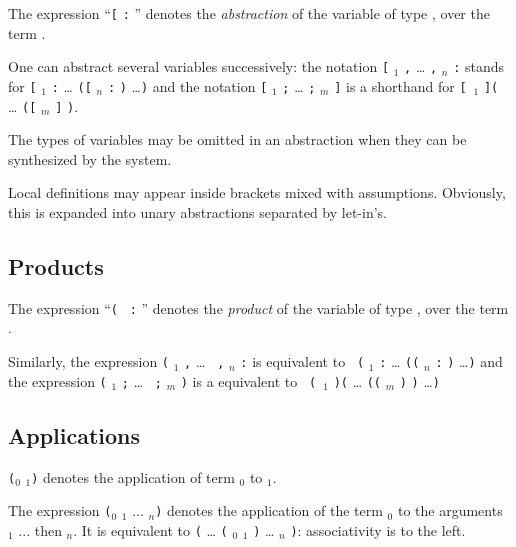 The expression ``{\tt [} {\ident} {\tt :} \type {\tt ]}
{\term}'' denotes the {\em abstraction} of the variable {\ident}
of type {\type}, over the term {\term}.

One can abstract several variables successively:
the notation {\tt [} {\ident$_{1}$} {\tt ,} {\ldots} {\tt ,} 
{\ident$_{n}$} {\tt :} \type {\tt ]} {\term} stands for 
{\tt [} {\ident$_{1}$} {\tt :} \type {\tt ](} {\ldots} 
{\tt ([} {\ident$_{n}$} {\tt :} \type {\tt ]} {\term} {\tt )} 
\ldots {\tt )} and the notation {\tt [} {\localassums$_{1}$} {\tt ;}
{\ldots} {\tt ;} {\localassums$_{m}$} {\tt ]} {\term} is a shorthand
for {\tt [}~{\localassums$_{1}$} {\tt ](} {\ldots} {\tt ([}
{\localassums$_{m}$} {\tt ]} {\term} {\tt )}.

\medskip
\Rem The types of variables may be omitted in an
abstraction when they can be synthesized by the system.

\Rem Local definitions may appear inside brackets mixed with
assumptions. Obviously, this is expanded into unary abstractions
separated by let-in's.


\subsection{Products}

The expression ``{\tt (}~{\ident} {\tt :} \type {\tt )}
{\term}'' denotes the {\em product} of the variable {\ident}
of type {\type}, over the term {\term}.

Similarly, the expression {\tt (} {\ident$_{1}$} {\tt ,} {\ldots} {\tt
,} {\ident$_{n}$} {\tt :} \type {\tt )} {\term} is equivalent to {\tt
(} {\ident$_{1}$} {\tt :} \type {\tt )(} {\ldots} {\tt ((}
{\ident$_{n}$} {\tt :} \type {\tt )} {\term} {\tt )} \ldots {\tt )}
and the expression {\tt (} {\typedidents$_{1}$} {\tt ;} {\ldots} {\tt
;} {\typedidents$_{m}$} {\tt )} {\term} is a equivalent to {\tt
(}~{\typedidents$_{1}$} {\tt )(} {\ldots} {\tt ((}
{\typedidents$_{m}$} {\tt )} {\term} {\tt )} \ldots {\tt )}

\subsection{Applications}

{\tt (}\term$_0$ \term$_1${\tt)} denotes the application of
  term \term$_0$ to \term$_1$.

The expression {\tt (}\term$_0$ \term$_1$ ...  \term$_n${\tt)}
denotes the application of the term \term$_0$ to the arguments
\term$_1$ ... then \term$_n$.  It is equivalent to {\tt (} {\ldots}
{\tt (} {\term$_0$} {\term$_1$} {\tt )} {\ldots} {\term$_n$} {\tt )}:
associativity is to the left.

